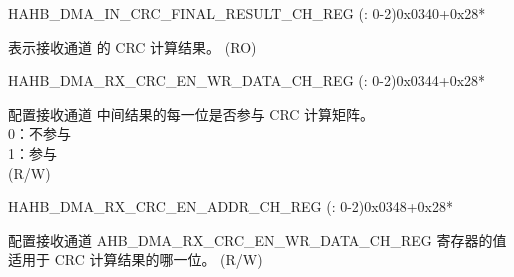 \begin{register}{H}{AHB\_DMA\_IN\_CRC\_FINAL\_RESULT\_CH\_REG (: 0-2)}{0x0340+0x28*}\label{regdesc:AHBDMAINCRCFINALRESULTCHNREG}
%
\regnewline%
\begin{regdesc}\begin{reglist}
\label{fielddesc:AHBDMAINCRCFINALRESULTCHN}\item [AHB\_DMA\_IN\_CRC\_FINAL\_RESULT\_CH\regindex{n}] 表示接收通道  的 CRC 计算结果。 (RO)
\end{reglist}\end{regdesc}
\end{register}


\begin{register}{H}{AHB\_DMA\_RX\_CRC\_EN\_WR\_DATA\_CH\_REG (: 0-2)}{0x0344+0x28*}\label{regdesc:AHBDMARXCRCENWRDATACHNREG}
%
\regnewline%
\begin{regdesc}\begin{reglist}
\label{fielddesc:AHBDMARXCRCENWRDATACHN}\item [AHB\_DMA\_RX\_CRC\_EN\_WR\_DATA\_CH\regindex{n}] 配置接收通道  中间结果的每一位是否参与 CRC 计算矩阵。\\
0：不参与\\
1：参与\\ (R/W)
\end{reglist}\end{regdesc}
\end{register}


\begin{register}{H}{AHB\_DMA\_RX\_CRC\_EN\_ADDR\_CH\_REG (: 0-2)}{0x0348+0x28*}\label{regdesc:AHBDMARXCRCENADDRCHNREG}
%
\regnewline%
\begin{regdesc}\begin{reglist}
\label{fielddesc:AHBDMARXCRCENADDRCHN}\item [AHB\_DMA\_RX\_CRC\_EN\_ADDR\_CH\regindex{n}] 配置接收通道  AHB\_DMA\_RX\_CRC\_EN\_WR\_DATA\_CH\_REG 寄存器的值适用于 CRC 计算结果的哪一位。 (R/W)
\end{reglist}\end{regdesc}
\end{register}


